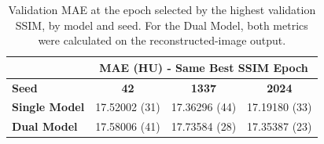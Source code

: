 \begin{table}[!htbp]
\centering
\begin{tabular}{lccc}
\hline
 & \multicolumn{3}{c}{\textbf{MAE (HU) - Same Best SSIM Epoch}} \\
\hline
\textbf{Seed} & \textbf{42} & \textbf{1337} & \textbf{2024} \\
\hline
\textbf{Single Model} & 17.52002 (31) & 17.36296 (44) & 17.19180 (33) \\
\textbf{Dual Model} & 17.58006 (41) & 17.73584 (28) & 17.35387 (23) \\
\hline
\end{tabular}
\par\smallskip
\captionsetup{skip=2pt}
\caption[Validation MAE at best validation SSIM]{Validation MAE at the epoch selected by the highest validation SSIM, by model and seed. For the Dual Model, both metrics were calculated on the reconstructed-image output.}
\label{tab:mae-at-best-validation-ssim}
\end{table}
